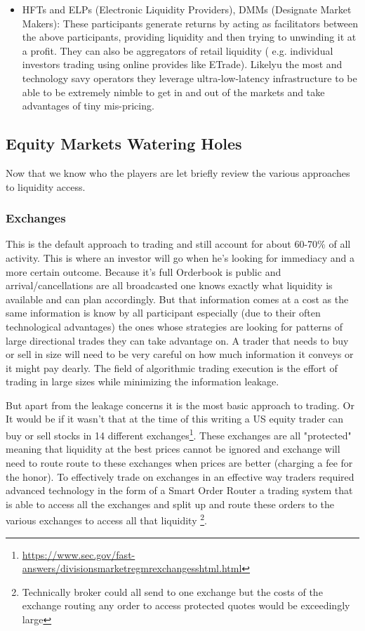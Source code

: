 \begin{itemize}
\item HFTs and ELPs (Electronic Liquidity Providers), DMMs (Designate Market Makers): These participants generate returns by acting as facilitators between the above participants, providing liquidity and then trying to unwinding it at a profit. They can also be aggregators of retail liquidity ( e.g. individual investors trading using online provides like ETrade). Likelyu the most  and technology savy operators they leverage ultra-low-latency infrastructure to be able to be extremely nimble to get in and out of the markets and take advantages of tiny mis-pricing.

\end{itemize}

\subsection{Equity Markets Watering Holes}
Now that we know who the players are let briefly review the various approaches to liquidity access.

\subsubsection{Exchanges}

This is the default approach to trading and still account for about 60-70\% of all activity. This is where an investor will go when he's looking for immediacy and a more certain outcome. Because it's full Orderbook is public and arrival/cancellations are all broadcasted one knows exactly what liquidity is available and can plan accordingly. But that information comes at a cost as the same information is know by all participant especially (due to their often technological advantages) the ones whose strategies are looking for patterns of large directional trades  they can take advantage on. A trader that needs to buy or sell in size will need to be very careful on how much information it conveys or it might pay dearly. The field of algorithmic trading execution is the effort of trading in large sizes while minimizing the information leakage.

But apart from the leakage concerns it is the most basic approach to trading. Or It would be if it wasn't that at the time of this writing a US equity trader can buy or sell stocks  in 14 different exchanges\footnote{\url{https://www.sec.gov/fast-answers/divisionsmarketregmrexchangesshtml.html}}. These exchanges are all "protected" meaning that liquidity at the best prices cannot be ignored and exchange will need to route route to these exchanges when prices are better (charging a fee for the honor). To effectively trade on exchanges in an effective way traders required advanced technology in the form of a Smart Order Router a trading system that is able to access all the exchanges and split up and route these orders to the various exchanges to access all that liquidity \footnote{Technically broker could all send to one exchange but the costs of the exchange routing any order to access protected quotes would be exceedingly large}.

